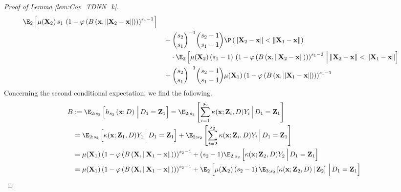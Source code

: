 \begin{proof}[Proof of Lemma \ref{lem:Cov_TDNN_k}]
\begin{equation}
\begin{aligned}
			\E_{2}\left[\mu(\mathbf{X}_2) \, s_1 \, \left(1 - \varphi\left(B\left(\mathbf{x}, \| \mathbf{X}_2 - \mathbf{x} \|\right)\right)\right)^{s_1 - 1}\right]                     \\
			 & \quad + \binom{s_2}{s_1}^{-1}\binom{s_2 - 1}{s_1 - 1}
			\P\left(\|\mathbf{X}_2 - \mathbf{x}\| < \|\mathbf{X}_1 - \mathbf{x}\|\right)                                                                                                \\
			 & \quad \quad \cdot
			\E_{2}\left[\mu(\mathbf{X}_2) \, (s_1 - 1) \,
				\left(1 - \varphi\left(B\left(\mathbf{x}, \| \mathbf{X}_2 - \mathbf{x} \|\right)\right)\right)^{s_1 - 2}
			\, \Big| \, \|\mathbf{X}_2 - \mathbf{x}\| < \|\mathbf{X}_1 - \mathbf{x}\|\right]                                                                                            \\
			 & \quad + \binom{s_2}{s_1}^{-1}\binom{s_2 - 1}{s_1 - 1}\mu(\mathbf{X}_1)
			\left(1 - \varphi\left(B\left(\mathbf{x}, \| \mathbf{X}_1 - \mathbf{x} \|\right)\right)\right)^{s_1 - 1}
		\end{aligned}
	\end{equation}
	Concerning the second conditional expectation, we find the following.
	\begin{equation}
		\begin{aligned}
			B
			 & := \E_{2:s_2}\left[h_{s_2}\left(\mathbf{x}; D\right)\, \Big| \, D_1 = \mathbf{Z}_1\right]
			= \E_{2:s_2}\left[\sum_{i = 1}^{s_2} \kappa(\mathbf{x}; \mathbf{Z}_i, D) Y_i \, \Big| \, D_1 = \mathbf{Z}_1\right]              \\
			 & = \E_{2:s_2}\left[\kappa(\mathbf{x}; \mathbf{Z}_1, D) Y_1 \, \Big| \, D_1 = \mathbf{Z}_1\right]
			+ \E_{2:s_2}\left[\sum_{i = 2}^{s_2} \kappa(\mathbf{x}; \mathbf{Z}_i, D) Y_i \, \Big| \, D_1 = \mathbf{Z}_1\right]              \\
			 & = \mu(\mathbf{X}_1) \left(1 - \varphi\left(B\left(\mathbf{X}, \| \mathbf{X}_1 - \mathbf{x} \|\right)\right)\right)^{s_2 - 1}
			+ (s_2 - 1)\E_{2:s_2}\left[\kappa(\mathbf{x}; \mathbf{Z}_2, D) Y_2 \, \Big| \, D_1 = \mathbf{Z}_1\right]                        \\
			 & = \mu(\mathbf{X}_1) \left(1 - \varphi\left(B\left(\mathbf{X}, \| \mathbf{X}_1 - \mathbf{x} \|\right)\right)\right)^{s_2 - 1}
			+ \E_{2}\left[
				\mu(\mathbf{X}_2) \, (s_2 - 1) \, \E_{3:s_2}\left[\kappa(\mathbf{x}; \mathbf{Z}_2, D)\, | \, \mathbf{Z}_2\right]
			\, \Big| \, D_1 = \mathbf{Z}_1\right]                                                                                           \\

\end{aligned}
\end{equation}
\end{proof}

